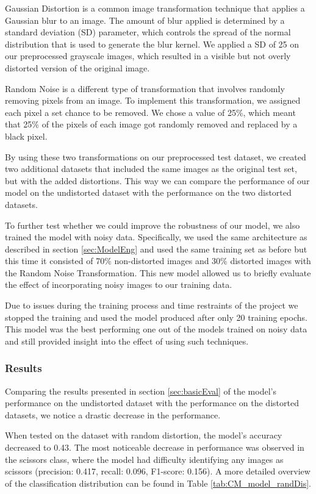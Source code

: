 \documentclass[a4paper]{article}
\begin{document}
Gaussian Distortion is a common image transformation technique that applies a Gaussian blur to an image. The amount of blur applied is determined by a standard deviation (SD) parameter, which controls the spread of the normal distribution that is used to generate the blur kernel. We applied a SD of 25 on our preprocessed grayscale images, which resulted in a visible but not overly distorted version of the original image.

Random Noise is a different type of transformation that involves randomly removing pixels from an image. To implement this transformation, we assigned each pixel a set chance to be removed. We chose a value of 25\%, which meant that 25\% of the pixels of each image got randomly removed and replaced by a black pixel. 

By using these two transformations on our preprocessed test dataset, we created two additional datasets that included the same images as the original test set, but with the added distortions. This way we can compare the performance of our model on the undistorted dataset with the performance on the two distorted datasets.

To further test whether we could improve the robustness of our model, we also trained the model with noisy data. Specifically, we used the same architecture as described in section \ref{sec:ModelEng} and used the same training set as before but this time it consisted of 70\% non-distorted images and 30\% distorted images with the Random Noise Transformation. This new model allowed us to briefly evaluate the effect of incorporating noisy images to our training data.

Due to issues during the training process and time restraints of the project we stopped the training and used the model produced after only 20 training epochs. This model was the best performing one out of the models trained on noisy data and still provided insight into the effect of using such techniques.

\subsubsection{Results}
Comparing the results presented in section \ref{sec:basicEval} of the model’s performance on the undistorted dataset with the performance on the distorted datasets, we notice a drastic decrease in the performance.

When tested on the dataset with random distortion, the model's accuracy decreased to 0.43. The most noticeable decrease in performance was observed in the scissors class, where the model had difficulty identifying any images as scissors (precision: 0.417, recall: 0.096, F1-score: 0.156). A more detailed overview of the classification distribution can be found in Table \ref{tab:CM_model_randDis}.
\end{document}
